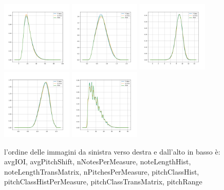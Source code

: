 \begin{figure}[!ht]
    \includegraphics[width=0.3\textwidth]{../images/realworldexperiments/scarlatti/realdata/TrainVsTest_nPitchesPerMeasure.png}
    \includegraphics[width=0.3\textwidth]{../images/realworldexperiments/scarlatti/realdata/TrainVsTest_pitchClassHist.png}
    \includegraphics[width=0.3\textwidth]{../images/realworldexperiments/scarlatti/realdata/TrainVsTest_pitchClassHistPerMeasure.png}
    \includegraphics[width=0.3\textwidth]{../images/realworldexperiments/scarlatti/realdata/TrainVsTest_pitchClassTransMatrix.png}
    \includegraphics[width=0.3\textwidth]{../images/realworldexperiments/scarlatti/realdata/TrainVsTest_pitchRange.png}
    \caption{l'ordine delle immagini da sinistra verso destra e dall'alto in basso è: avgIOI, avgPitchShift, nNotesPerMeasure, noteLengthHist, noteLengthTransMatrix, nPitchesPerMeasure, pitchClassHist, pitchClassHistPerMeasure, pitchClassTransMatrix, pitchRange}
\end{figure}


